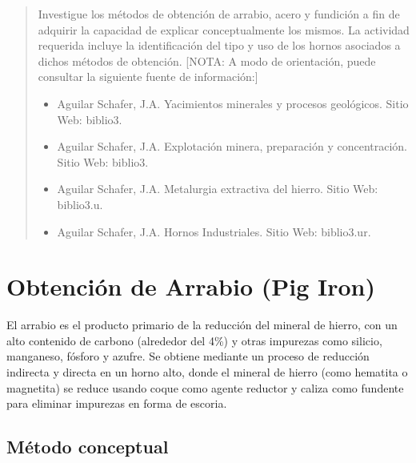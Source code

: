 \documentclass[12pt,a4paper]{article}
\begin{document}

\newpage
\tableofcontents

\begin{abstract}
    Investigue los métodos de obtención de arrabio, acero y fundición a fin de adquirir la capacidad de explicar conceptualmente los mismos. La actividad requerida incluye la identificación del tipo y uso de los hornos asociados a dichos métodos de obtención. [NOTA: A modo de orientación, puede consultar la siguiente fuente de información:]
    \begin{itemize}
        \item Aguilar Schafer, J.A. Yacimientos minerales y procesos geológicos. Sitio Web: biblio3.
        \item Aguilar Schafer, J.A. Explotación minera, preparación y concentración. Sitio Web: biblio3.
        \item Aguilar Schafer, J.A. Metalurgia extractiva del hierro. Sitio Web: biblio3.u.
        \item Aguilar Schafer, J.A. Hornos Industriales. Sitio Web: biblio3.ur.
    \end{itemize}
\end{abstract}

\section{Obtención de Arrabio (Pig Iron)}

El arrabio es el producto primario de la reducción del mineral de hierro, con un alto contenido de carbono (alrededor del 4\%) y otras impurezas como silicio, manganeso, fósforo y azufre. Se obtiene mediante un proceso de reducción indirecta y directa en un horno alto, donde el mineral de hierro (como hematita o magnetita) se reduce usando coque como agente reductor y caliza como fundente para eliminar impurezas en forma de escoria.

\subsection{Método conceptual}
\end{document}
